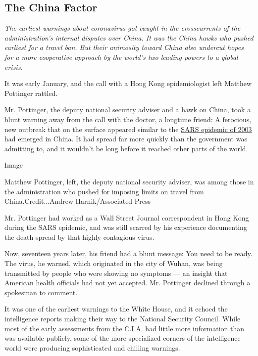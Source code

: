 \hypertarget{the-china-factor}{%
\subsection{The China Factor}\label{the-china-factor}}

\emph{The earliest warnings about coronavirus got caught in the
crosscurrents of the administration's internal disputes over China. It
was the China hawks who pushed earliest for a travel ban. But their
animosity toward China also undercut hopes for a more cooperative
approach by the world's two leading powers to a global crisis.}

It was early January, and the call with a Hong Kong epidemiologist left
Matthew Pottinger rattled.

Mr. Pottinger, the deputy national security adviser and a hawk on China,
took a blunt warning away from the call with the doctor, a longtime
friend: A ferocious, new outbreak that on the surface appeared similar
to the
\href{https://www.nytimes3xbfgragh.onion/2003/04/27/world/the-sars-epidemic-the-path-from-china-s-provinces-a-crafty-germ-breaks-out.html}{SARS
epidemic of 2003} had emerged in China. It had spread far more quickly
than the government was admitting to, and it wouldn't be long before it
reached other parts of the world.

Image

Matthew Pottinger, left, the deputy national security adviser, was among
those in the administration who pushed for imposing limits on travel
from China.Credit...Andrew Harnik/Associated Press

Mr. Pottinger had worked as a Wall Street Journal correspondent in Hong
Kong during the SARS epidemic, and was still scarred by his experience
documenting the death spread by that highly contagious virus.

Now, seventeen years later, his friend had a blunt message: You need to
be ready. The virus, he warned, which originated in the city of Wuhan,
was being transmitted by people who were showing no symptoms --- an
insight that American health officials had not yet accepted. Mr.
Pottinger declined through a spokesman to comment.

It was one of the earliest warnings to the White House, and it echoed
the intelligence reports making their way to the National Security
Council. While most of the early assessments from the C.I.A. had little
more information than was available publicly, some of the more
specialized corners of the intelligence world were producing
sophisticated and chilling warnings.

